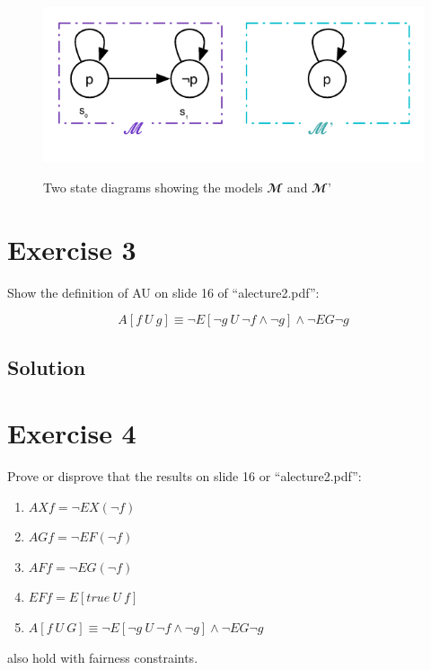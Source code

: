 \documentclass[a4paper, 12pt]{article}
\begin{document}
\begin{figure}[htbp]
    \caption{Two state diagrams showing the models $𝓜$ and $𝓜’$}
    \vskip 0.2cm
    \centering
    \includegraphics[width=1\textwidth]{Figures/State Diagram AGEFp}
    \label{figure:State_Diagram_AGEFp}
\end{figure}

\section{Exercise 3}

Show the definition of AU on slide 16 of “alecture2.pdf”:

\[
    A[f ~U~ g] ≡ ¬E[¬g~U~¬f ∧ ¬g] ∧ ¬EG¬g
\]

\subsection{Solution}



\section{Exercise 4}

Prove or disprove that the results on slide 16 or “alecture2.pdf”:
\begin{enumerate}
    \item $AX f = ¬EX(¬f)$
    \item $AG f = ¬EF(¬f)$
    \item $AF f = ¬EG(¬f)$
    \item $EF f = E[true~U~f]$
    \item $A[f~U~G] ≡ ¬E[¬g~U~¬f ∧ ¬g] ∧ ¬EG ¬g$
\end{enumerate}
also hold with fairness constraints.



\end{document}
